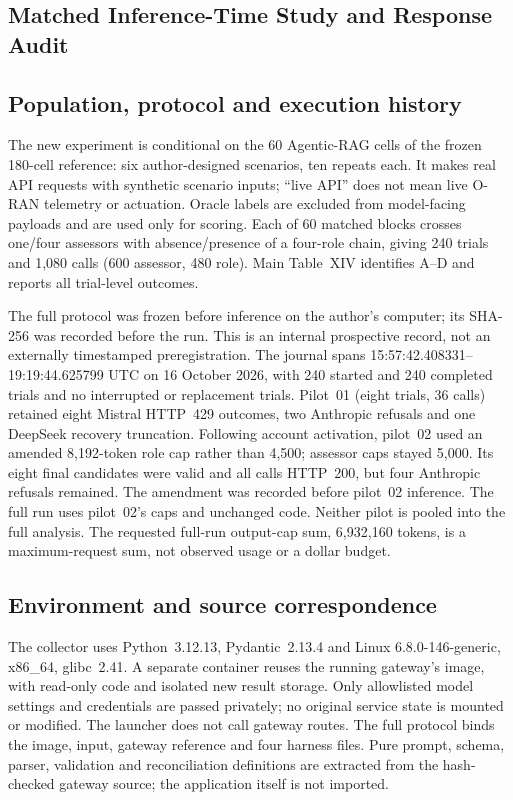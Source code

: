\begin{revision}
\section{Matched Inference-Time Study and Response Audit}
\label{sec:matched-supp}
\subsection{Population, protocol and execution history}
The new experiment is conditional on the 60 Agentic-RAG cells of the frozen
180-cell reference: six author-designed scenarios, ten repeats each. It
makes real API requests with synthetic scenario inputs; ``live API'' does
not mean live O-RAN telemetry or actuation. Oracle labels are excluded from
model-facing payloads and are used only for scoring. Each of 60 matched
blocks crosses one/four assessors with absence/presence of a four-role
chain, giving 240 trials and 1,080 calls (600 assessor, 480 role).
Main Table~XIV identifies A--D and reports all trial-level outcomes.

The full protocol was frozen before inference on the author's computer;
its SHA-256 was recorded before the run. This is an internal prospective
record, not an externally timestamped preregistration. The journal spans
15:57:42.408331--19:19:44.625799 UTC on 16 October 2026, with 240 started and
240 completed trials and no interrupted or replacement trials. Pilot~01
(eight trials, 36 calls) retained eight Mistral HTTP~429 outcomes, two
Anthropic refusals and one DeepSeek recovery truncation. Following account
activation, pilot~02 used an amended 8,192-token role cap rather than 4,500;
assessor caps stayed 5,000. Its eight final candidates were valid and all
calls HTTP~200, but four Anthropic refusals remained. The amendment was
recorded before pilot~02 inference. The full run uses pilot~02's caps and
unchanged code. Neither pilot is pooled into the full analysis. The
requested full-run output-cap sum, 6,932,160 tokens, is a maximum-request
sum, not observed usage or a dollar budget.

\subsection{Environment and source correspondence}
The collector uses Python~3.12.13, Pydantic~2.13.4 and Linux
6.8.0-146-generic, x86\_64, glibc~2.41. A separate container reuses the
running gateway's image, with read-only code and isolated new result storage.
Only allowlisted model settings and credentials are passed privately; no
original service state is mounted or modified. The launcher does not call
gateway routes. The full protocol binds the image, input, gateway reference
and four harness files. Pure prompt, schema, parser, validation and
reconciliation definitions are extracted from the hash-checked gateway
source; the application itself is not imported.


\end{revision}

